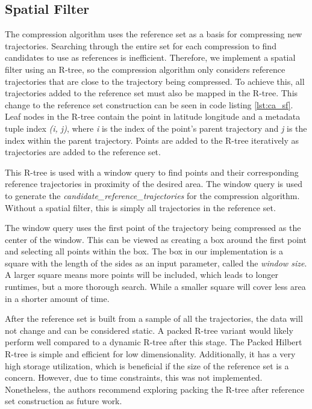 \subsection{Spatial Filter}
\label{sec:sf}
The compression algorithm uses the reference set as a basis for compressing new trajectories. Searching through the entire set for each compression to find candidates to use as references is inefficient. Therefore, we implement a spatial filter using an R-tree, so the compression algorithm only considers reference trajectories that are close to the trajectory being compressed. To achieve this, all trajectories added to the reference set must also be mapped in the R-tree. This change to the reference set construction can be seen in code listing \ref{lst:ca_sf}. Leaf nodes in the R-tree contain the point in latitude longitude and a metadata tuple index \textit{(i, j)}, where \textit{i} is the index of the point's parent trajectory and \textit{j} is the index within the parent trajectory. Points are added to the R-tree iteratively as trajectories are added to the reference set.

This R-tree is used with a window query to find points and their corresponding reference trajectories in proximity of the desired area. The window query is used to generate the \textit{candidate\_reference\_trajectories} for the compression algorithm. Without a spatial filter, this is simply all trajectories in the reference set.

The window query uses the first point of the trajectory being compressed as the center of the window. This can be viewed as creating a box around the first point and selecting all points within the box. The box in our implementation is a square with the length of the sides as an input parameter, called the \textit{window size}. A larger square means more points will be included, which leads to longer runtimes, but a more thorough search. While a smaller square will cover less area in a shorter amount of time.

After the reference set is built from a sample of all the trajectories, the data will not change and can be considered static. A packed R-tree variant would likely perform well compared to a dynamic R-tree after this stage. The Packed Hilbert R-tree is simple and efficient for low dimensionality. Additionally, it has a very high storage utilization, which is beneficial if the size of the reference set is a concern. However, due to time constraints, this was not implemented. Nonetheless, the authors recommend exploring packing the R-tree after reference set construction as future work.

